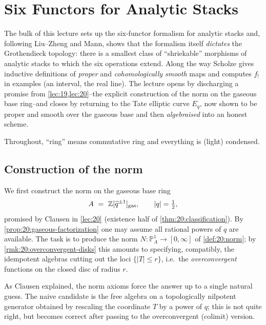 \section{Six Functors for Analytic Stacks}
\label{lec:21}

The bulk of this lecture sets up the six-functor formalism for analytic stacks
and, following Liu--Zheng and Mann, shows that the formalism itself \emph{dictates}
the Grothendieck topology: there is a smallest class of ``shriekable'' morphisms
of analytic stacks to which the six operations extend. Along the way Scholze
gives inductive definitions of \emph{proper} and \emph{cohomologically smooth}
maps and computes $f_!$ in examples (an interval, the real line). The lecture
opens by discharging a promise from \cref{lec:19,lec:20}--the explicit
construction of the norm on the gaseous base ring--and closes by returning to
the Tate elliptic curve $E_q$, now shown to be proper and smooth over the
gaseous base and then \emph{algebraised} into an honest scheme.

Throughout, ``ring'' means commutative ring and everything is (light) condensed.

\subsection{Construction of the norm}
\label{subsec:21:norm}

We first construct the norm on the gaseous base ring
\begin{equation*}
A\ =\ \mathbb Z[\widehat q^{\pm1}]_{\mathrm{gas}},\qquad |q|=\tfrac12,
\end{equation*}
promised by Clausen in \cref{lec:20} (existence half of
\cref{thm:20:classification}). By \cref{prop:20:gaseous-factorization} one may
assume all rational powers of $q$ are available. The task is to produce the norm
$N\colon\mathbb P^1_A\to[0,\infty]$ of \cref{def:20:norm}; by
\cref{rmk:20:overconvergent-disks} this amounts to specifying, compatibly, the
idempotent algebras cutting out the loci $\{|T|\le r\}$, i.e.\ the
\emph{overconvergent} functions on the closed disc of radius $r$.

As Clausen explained, the norm axioms force the answer up to a single natural
guess. The naive candidate is the free algebra on a topologically nilpotent
generator obtained by rescaling the coordinate $T$ by a power of $q$; this is
not quite right, but becomes correct after passing to the overconvergent
(colimit) version.

